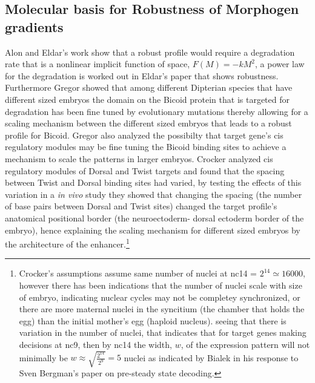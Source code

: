 \subsection{Molecular basis for Robustness of Morphogen gradients}

Alon and Eldar's work show that a robust profile would require a degradation rate that is a nonlinear implicit function of space, $F(M) = -kM^2$, a power law for the degradation is worked out in Eldar's paper that shows robustness\cite{pmid12239569}.  Furthermore Gregor showed that among different Dipterian species that have different sized embryos the domain on the Bicoid protein that is targeted for degradation has been fine tuned by evolutionary mutations thereby allowing for a scaling mechanism between the different sized embryos that leads to a robust profile for Bicoid.  Gregor also analyzed the possibilty that target gene's cis regulatory modules may be fine tuning the Bicoid binding sites to achieve a mechanism to scale the patterns in larger embryos\cite{pmid16352710}\cite{pmid16352710}.  Crocker analyzed cis regulatory modules of Dorsal and Twist targets and found that the spacing between Twist and Dorsal binding sites had varied, by testing the effects of this variation in a \textit{in vivo} study they showed that changing the spacing (the number of base pairs between Dorsal and Twist sites) changed the target profile's anatomical positional border (the neuroectoderm- dorsal ectoderm border of the embryo), hence explaining the scaling mechanism for different sized embryos by the architecture of the enhancer.\footnote[1]{Crocker's assumptions assume same number of nuclei at nc14 = $2^{14} \simeq 16000$, however there has been indications that the number of nuclei scale with size of embryo, indicating nuclear cycles may not be completey synchronized, or there are more maternal nuclei in the syncitium (the chamber that holds the egg) than the initial mother's egg (haploid nucleus).\cite{kreitman} seeing that there is variation in the number of nuclei, that indicates that for target genes making decisions at nc9, then by nc14 the width, $w$, of the expression pattern will not minimally be $w \approx \sqrt{\frac{2^{14}}{2^9}} =5 $ nuclei as indicated by Bialek in his response to Sven Bergman's paper on pre-steady state decoding\cite{Response}\cite{pmid17298180}. } 